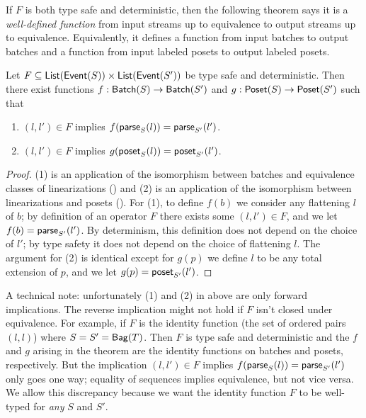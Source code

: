 If $F$ is both type safe and deterministic, then the following theorem says it is a \emph{well-defined function} from input streams up to equivalence to output streams up to equivalence.
Equivalently, it defines a function from input batches to output batches
and a function from input labeled posets to output labeled posets.

\begin{theorem}
\label{thm:type-safe-and-deterministic-consequence}
Let $F \subseteq \listtype{\event{S}} \times \listtype{\event{S'}}$ be type safe and deterministic.
Then there exist functions $f: \batch{S} \to \batch{S'}$ and $g: \poset{S} \to \poset{S'}$
such that
\begin{enumerate}
\item[(1)] $(l, l') \in F$ implies $f(\parselin{l}{S}) = \parselin{l'}{S'}$.
\item[(2)] $(l, l') \in F$ implies $g(\posetlin{l}{S}) = \posetlin{l'}{S'}$.
\end{enumerate}
\end{theorem}
\begin{proof}
(1) is an application of the isomorphism between batches and equivalence classes of linearizations () and (2) is an application of the isomorphism between linearizations and posets ().
For (1), to define $f(b)$ we consider any flattening $l$ of $b$; by definition of an operator $F$ there exists some $(l, l') \in F$, and we let $f(b) = \parselin{l'}{S'}$. By determinism, this definition does not depend on the choice of $l'$; by type safety it does not depend on the choice of flattening $l$.
The argument for (2) is identical except for $g(p)$ we define $l$ to be any total extension of $p$, and we let $g(p) = \posetlin{l'}{S'}$.
\end{proof}

A technical note: unfortunately (1) and (2) in  above are only forward implications.
The reverse implication might not hold if $F$ isn't closed under equivalence. For example, if $F$ is the identity function (the set of ordered pairs $(l, l)$) where $S = S' = \relleaf{T}$. Then $F$ is type safe and deterministic and the $f$ and $g$ arising in the theorem are the identity functions on batches and posets, respectively. But the implication $(l, l') \in F$ implies $f(\parselin{l}{S}) = \parselin{l'}{S'}$ only goes one way; equality of sequences implies equivalence, but not vice versa.
We allow this discrepancy because we want the identity function $F$ to be well-typed for \emph{any} $S$ and $S'$.

